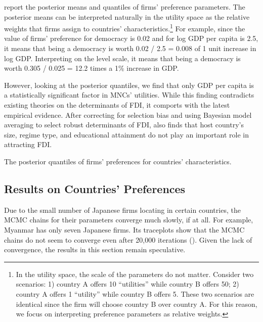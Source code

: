  report the posterior means and quantiles of firms' preference parameters. The posterior means can be interpreted naturally in the utility space as the relative weights that firms assign to countries' characteristics.\footnote{In the utility space, the scale of the parameters do not matter. Consider two scenarios: 1) country A offers 10 ``utilities'' while country B offers 50; 2) country A offers 1 ``utility'' while country B offers 5. These two scenarios are identical since the firm will choose country B over country A. For this reason, we focus on interpreting preference parameters as relative weights.} For example, since the value of firms' preference for democracy is 0.02 and for log GDP per capita is 2.5, it means that being a democracy is worth 0.02 / 2.5 = 0.008 of 1 unit increase in log GDP. Interpreting on the level scale, it means that being a democracy is worth 0.305 / 0.025 = 12.2 times a 1\% increase in GDP.

However, looking at the posterior quantiles, we find that only GDP per capita is a statistically significant factor in MNCs' utilities. While this finding contradicts existing theories on the determinants of FDI, it comports with the latest empirical evidence. After correcting for selection bias and using Bayesian model averaging to select robust determinants of FDI, \citet{Eicher2012} also finds that host country's size, regime type, and educational attainment do not play an important role in attracting FDI.

\begin{table}[!ht]
\centering

\caption{The posterior quantiles of firms' preferences for countries' characteristics.}
\label{tab:posterior_alpha}
\end{table}

\subsection{Results on Countries' Preferences}

Due to the small number of Japanese firms locating in certain countries, the MCMC chains for their parameters converge much slowly, if at all. For example, Myanmar has only seven Japanese firms. Its traceplots show that the MCMC chains do not seem to converge even after 20,000 iterations (). Given the lack of convergence, the results in this section remain speculative.

